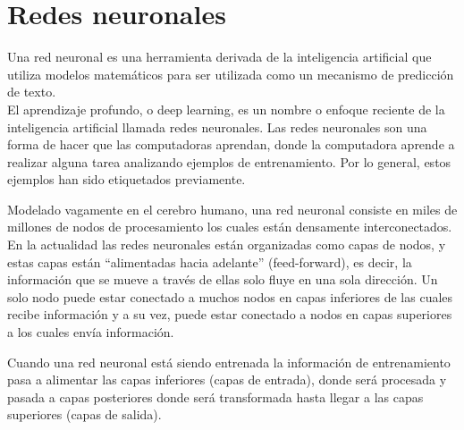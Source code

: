 \documentclass[12pt, a4paper, titlepage]{report}
\begin{document}
	    \section{Redes neuronales}
	    Una red neuronal es una herramienta derivada de la inteligencia artificial que utiliza modelos matemáticos para ser utilizada como un mecanismo de predicción de texto.\\
	    El aprendizaje profundo, o deep learning, es un nombre o enfoque reciente de la inteligencia artificial llamada redes neuronales. Las redes neuronales son una forma de hacer que las computadoras aprendan, donde la computadora aprende a realizar alguna tarea analizando ejemplos de entrenamiento. Por lo general, estos ejemplos han sido etiquetados previamente.\par
		Modelado vagamente en el cerebro humano, una red neuronal consiste en miles de millones de nodos de procesamiento los cuales están densamente interconectados. En la actualidad las redes neuronales están organizadas como capas de nodos, y estas capas están “alimentadas hacia adelante” (feed-forward), es decir, la información que se mueve a través de ellas solo fluye en una sola dirección. Un solo nodo puede estar conectado a muchos nodos en capas inferiores de las cuales recibe información y a su vez, puede estar conectado a nodos en capas superiores a los cuales envía información.\par
		Cuando una red neuronal está siendo entrenada la información de entrenamiento pasa a alimentar las capas inferiores (capas de entrada), donde será procesada y pasada a capas posteriores donde será transformada hasta llegar a las capas superiores (capas de salida).\cite{refQueSonRedesNeu}
\end{document}
